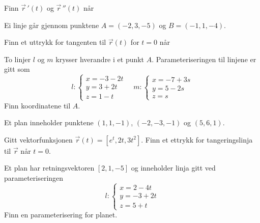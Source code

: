 




	
\opgt

Finn $\vec{r}\,'(t)$ og $\vec{r}\,''(t)$ når \os
{}


Ei linje går gjennom punktene $ A=(-2, 3, -5) $ og $ B=(-1, 1, -4) $.\os
{}

Finn et uttrykk for tangenten til $\vec{r}(t)$ for $t=0$ når \os
{}

To linjer $ l $ og $ m $ krysser hverandre i et punkt $ A $. Parameteriseringen til linjene er gitt som
\[l: \left\lbrace{
	\begin{array}{l}
	x=-3-2t  \\
	y= 3+ 2t   \\
	z= 1-t 
	\end{array}
}\right. \quad 
m: \left\lbrace{
	\begin{array}{l}
	x=-7 +3s  \\
	y= 5- 2s   \\
	z= s 
	\end{array}
}\right. \]
Finn koordinatene til $ A $.

Et plan inneholder punktene $ (1, 1,-1) $, $ (-2, -3, -1) $ og $ (5, 6, 1) $.

Gitt vektorfunksjonen $\vec{r}(t)=[e^t, 2t, 3t^2]$. Finn et ettrykk for tangeringslinja til $\vec{r}$ når $t=0$.

Et plan har retningsvektoren $ [2, 1, -5] $ og inneholder linja gitt ved parameteriseringen
\[ l: \left\lbrace{
	\begin{array}{l}
	x=2-4t  \\
	y= -3+ 2t   \\
	z= 5+t 
	\end{array}
}\right. \]
Finn en parameterisering for planet.


